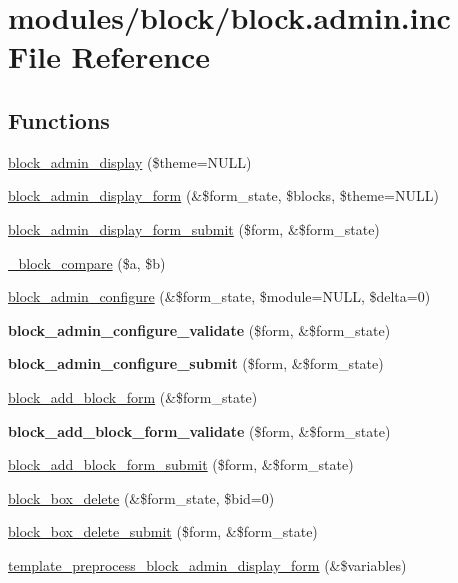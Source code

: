 \hypertarget{block_8admin_8inc}{
\section{modules/block/block.admin.inc File Reference}
\label{block_8admin_8inc}
}
\subsection*{Functions}
\begin{CompactItemize}
\item 
\hyperlink{block_8admin_8inc_46d186397b98e4faf46681f7f9cd86a1}{block\_\-admin\_\-display} (\$theme=NULL)
\item 
\hyperlink{block_8admin_8inc_576161bbf4ada256c05756fd9b2a7b07}{block\_\-admin\_\-display\_\-form} (\&\$form\_\-state, \$blocks, \$theme=NULL)
\item 
\hyperlink{block_8admin_8inc_9a7a5d16e2db34422f490e08d4bda247}{block\_\-admin\_\-display\_\-form\_\-submit} (\$form, \&\$form\_\-state)
\item 
\hyperlink{block_8admin_8inc_821b5a94dc38440d9ae55657e4a2c1ea}{\_\-block\_\-compare} (\$a, \$b)
\item 
\hyperlink{block_8admin_8inc_372fcc9d5969bca36bb69c05608a8767}{block\_\-admin\_\-configure} (\&\$form\_\-state, \$module=NULL, \$delta=0)
\item 
\hypertarget{block_8admin_8inc_5c45bd363e4fcbacea89a31e60215b47}{
\textbf{block\_\-admin\_\-configure\_\-validate} (\$form, \&\$form\_\-state)}
\label{block_8admin_8inc_5c45bd363e4fcbacea89a31e60215b47}

\item 
\hypertarget{block_8admin_8inc_5f23480eb6a76d82ab516f09baaa2318}{
\textbf{block\_\-admin\_\-configure\_\-submit} (\$form, \&\$form\_\-state)}
\label{block_8admin_8inc_5f23480eb6a76d82ab516f09baaa2318}

\item 
\hyperlink{block_8admin_8inc_bcbf959ca716a7dccd1c642d95fc6f71}{block\_\-add\_\-block\_\-form} (\&\$form\_\-state)
\item 
\hypertarget{block_8admin_8inc_01e910bd6f2a2cab75dde1db2df7af9b}{
\textbf{block\_\-add\_\-block\_\-form\_\-validate} (\$form, \&\$form\_\-state)}
\label{block_8admin_8inc_01e910bd6f2a2cab75dde1db2df7af9b}

\item 
\hyperlink{block_8admin_8inc_b1b62b97e79a16ab5a83cc746429601d}{block\_\-add\_\-block\_\-form\_\-submit} (\$form, \&\$form\_\-state)
\item 
\hyperlink{block_8admin_8inc_12e1e06e9bedb58ee6e14314ad211caf}{block\_\-box\_\-delete} (\&\$form\_\-state, \$bid=0)
\item 
\hyperlink{block_8admin_8inc_40e3265df938e03fb4eada48e559a109}{block\_\-box\_\-delete\_\-submit} (\$form, \&\$form\_\-state)
\item 
\hyperlink{block_8admin_8inc_790da1d1c8cea6bceca5374a4e410c01}{template\_\-preprocess\_\-block\_\-admin\_\-display\_\-form} (\&\$variables)
\end{CompactItemize}


